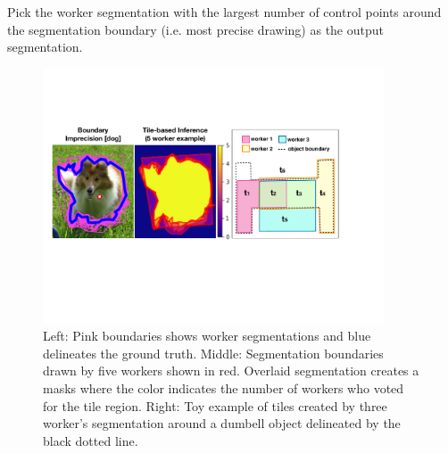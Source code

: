 \par \noindent Pick the worker segmentation with the largest number of control points around the segmentation boundary (i.e. most precise drawing) as the output segmentation.

\begin{figure}[h!]
\centering
\includegraphics[width=0.9\textwidth]{plots/precision_issue_tile_example.pdf}
\caption{Left: Pink boundaries shows worker segmentations and blue delineates the ground truth. Middle: Segmentation boundaries drawn by five workers shown in red. Overlaid segmentation creates a masks where the color indicates the number of workers who voted for the tile region. Right: Toy example of tiles created by three worker's segmentation around a dumbell object delineated by the black dotted line.}
\label{tile_demo}
\setlength{\abovecaptionskip}{-10pt}
\setlength{\belowcaptionskip}{-25pt}
\end{figure}  